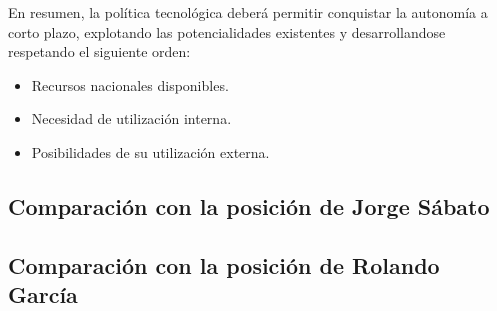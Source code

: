 En resumen, la política tecnológica deberá permitir conquistar la autonomía a corto
plazo, explotando las potencialidades existentes y desarrollandose respetando el siguiente orden:
\begin{itemize}
    \item Recursos nacionales disponibles.
    \item Necesidad de utilización interna.
    \item Posibilidades de su utilización externa.
\end{itemize}

\subsection*{Comparación con la posición de Jorge Sábato}

\subsection*{Comparación con la posición de Rolando García}
